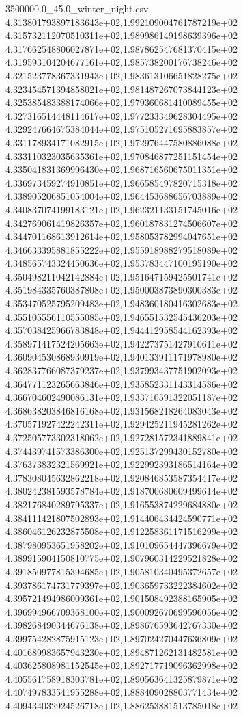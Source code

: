 \begin{filecontents*}{3500000.0_45.0_winter_night.csv}
4.313801793897183643e+02,1.992109004761787219e+02
4.315732112070510311e+02,1.989986149198639396e+02
4.317662548806027871e+02,1.987862547681370415e+02
4.319593104204677161e+02,1.985738200176738246e+02
4.321523778367331943e+02,1.983613106651828275e+02
4.323454571394858021e+02,1.981487267073844123e+02
4.325385483388174066e+02,1.979360681410089455e+02
4.327316514448114617e+02,1.977233349628304495e+02
4.329247664675384044e+02,1.975105271695883857e+02
4.331178934171082915e+02,1.972976447580886088e+02
4.333110323035635361e+02,1.970846877251151454e+02
4.335041831369996430e+02,1.968716560675011351e+02
4.336973459274910851e+02,1.966585497820715318e+02
4.338905206851054004e+02,1.964453688656703889e+02
4.340837074199183121e+02,1.962321133151745016e+02
4.342769061419826357e+02,1.960187831274506607e+02
4.344701168613912614e+02,1.958053782994047651e+02
4.346633395881855222e+02,1.955918988279518089e+02
4.348565743324450636e+02,1.953783447100195190e+02
4.350498211042142884e+02,1.951647159425501741e+02
4.351984335760387808e+02,1.950003873890300383e+02
4.353470525795209483e+02,1.948360180416302683e+02
4.355105556110555085e+02,1.946551532545436203e+02
4.357038425966783848e+02,1.944412958544162393e+02
4.358971417524205663e+02,1.942273751427910611e+02
4.360904530868930919e+02,1.940133911171978980e+02
4.362837766087379237e+02,1.937993437751902093e+02
4.364771123265663846e+02,1.935852331143314586e+02
4.366704602490086131e+02,1.933710591322051187e+02
4.368638203846816168e+02,1.931568218264083043e+02
4.370571927422242311e+02,1.929425211945281262e+02
4.372505773302318062e+02,1.927281572341889841e+02
4.374439741573386300e+02,1.925137299430152780e+02
4.376373832321569921e+02,1.922992393186514164e+02
4.378308045632862218e+02,1.920846853587354417e+02
4.380242381593578784e+02,1.918700680609499614e+02
4.382176840289795337e+02,1.916553874229684880e+02
4.384111421807502893e+02,1.914406434424590771e+02
4.386046126232875508e+02,1.912258361171516299e+02
4.387980953651958202e+02,1.910109654447396679e+02
4.389915904150810775e+02,1.907960314229521828e+02
4.391850977815394685e+02,1.905810340495372657e+02
4.393786174731779397e+02,1.903659733222384602e+02
4.395721494986009361e+02,1.901508492388165905e+02
4.396994966709368100e+02,1.900092670699596056e+02
4.398268490344676138e+02,1.898676593642767330e+02
4.399754282875915123e+02,1.897024270447636809e+02
4.401689983657943230e+02,1.894871262131482581e+02
4.403625808981152545e+02,1.892717719096362998e+02
4.405561758918303781e+02,1.890563641325879871e+02
4.407497833541955288e+02,1.888409028803771434e+02
4.409434032924526718e+02,1.886253881513785018e+02

\end{filecontents*}
